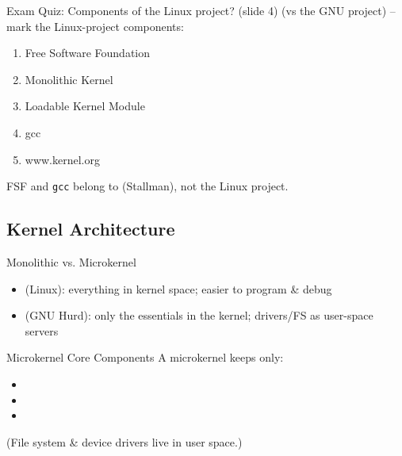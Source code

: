 \begin{example2}{Exam Quiz: Components of the Linux project? (slide 4)}
    (vs the GNU project) -- mark the Linux-project components:
    \begin{enumerate}
        \item Free Software Foundation
        \item Monolithic Kernel
        \item Loadable Kernel Module
        \item gcc
        \item www.kernel.org
    \end{enumerate}
    \tcblower
    FSF and \texttt{gcc} belong to  (Stallman), not the Linux project.
\end{example2}

\subsection{Kernel Architecture}



\begin{concept}{Monolithic vs. Microkernel}
    \begin{itemize}
        \item {} (Linux): everything in kernel space; easier to
              program \& debug
        \item {} (GNU Hurd): only the essentials in the kernel;
              drivers/FS as user-space servers
    \end{itemize}
\end{concept}

\begin{corollary}{Microkernel Core Components}
    A microkernel keeps only:
    \begin{itemize}
        \item {}
        \item {}
        \item {}
    \end{itemize}
    (File system \& device drivers live in user space.)
\end{corollary}


